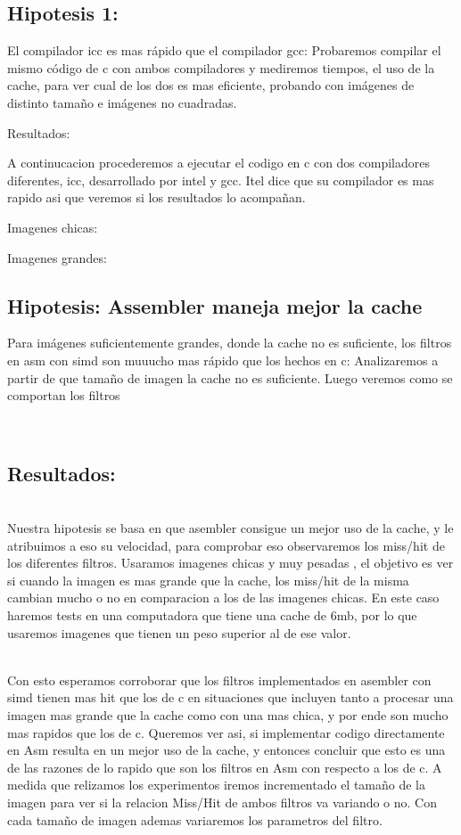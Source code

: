 \subsection{Hipotesis 1:}


El compilador icc es mas rápido que el compilador gcc: Probaremos compilar el mismo código de c con ambos compiladores y mediremos tiempos, el uso de la cache, para ver cual de los dos es mas eficiente, probando con imágenes de distinto tamaño e imágenes no cuadradas.

Resultados:

A continucacion procederemos a ejecutar el codigo en c con dos compiladores diferentes, icc, desarrollado por intel y gcc. Itel dice que su compilador es mas rapido asi que veremos si los resultados lo acompañan.

Imagenes chicas:

Imagenes grandes:


\subsection{Hipotesis: Assembler maneja mejor la cache}

Para imágenes suficientemente grandes, donde la cache no es suficiente, los filtros en asm con simd son muuucho mas rápido que los hechos en c: Analizaremos a partir de que tamaño de imagen la cache no es suficiente. Luego veremos como se comportan los filtros

\\
\subsection{Resultados:}\\

Nuestra hipotesis se basa en que asembler consigue un mejor uso de la cache, y le atribuimos a eso su velocidad, para comprobar eso observaremos los miss/hit de los diferentes filtros. Usaramos imagenes chicas y muy pesadas , el objetivo es ver si cuando la imagen es mas grande que la cache, los miss/hit de la misma cambian mucho o no en comparacion a los de las imagenes chicas. En este caso haremos tests en una computadora que tiene una cache de 6mb, por lo que usaremos imagenes que tienen un peso superior al de ese valor. 

\\
Con esto esperamos corroborar que los filtros implementados en asembler con simd tienen mas hit que los de c en situaciones que incluyen tanto a procesar una imagen mas grande que la cache como con una mas chica, y por ende son mucho mas rapidos que los de c. Queremos ver asi, si implementar codigo directamente en Asm resulta en un mejor uso de la cache, y entonces concluir que esto es una de las razones de lo rapido que son los filtros en Asm con respecto a los de c. A medida que relizamos los experimentos iremos incrementado el tamaño de la imagen para ver si la relacion Miss/Hit de ambos filtros va variando o no. Con cada tamaño de imagen ademas variaremos los parametros del filtro. 

